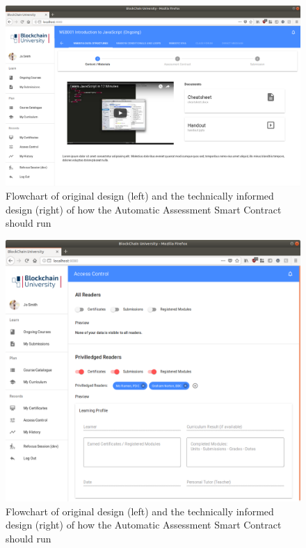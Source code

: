 \begin{figure}[!ht]
	\centering
	\includegraphics[width=1.0\textwidth]{Learner_ongoing1}
	\caption[Learner Application Example Ongoing Module Page]
	{Flowchart of original design (left) and the technically informed design (right) of how the Automatic Assessment Smart Contract should run}
	\label{fig:Learner_ongoing1}
\end{figure}

\begin{figure}[!ht]
	\centering
	\includegraphics[width=1.0\textwidth]{Learner_AC}
	\caption[Learner Application Access Control Page]
	{Flowchart of original design (left) and the technically informed design (right) of how the Automatic Assessment Smart Contract should run}
	\label{fig:Learner_AC}
\end{figure}

